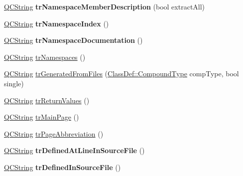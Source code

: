 \begin{DoxyCompactItemize}
\item 
\mbox{\label{class_translator_dutch_a76c136bcd3da1ec4d9bd0d3afda3864b}} 
\mbox{\hyperlink{class_q_c_string}{Q\+C\+String}} {\bfseries tr\+Namespace\+Member\+Description} (bool extract\+All)
\item 
\mbox{\label{class_translator_dutch_a561f514ca48fcc3adc2e9e7ef0eb7c33}} 
\mbox{\hyperlink{class_q_c_string}{Q\+C\+String}} {\bfseries tr\+Namespace\+Index} ()
\item 
\mbox{\label{class_translator_dutch_acff143c17da76c9e82f6f2e57650dcce}} 
\mbox{\hyperlink{class_q_c_string}{Q\+C\+String}} {\bfseries tr\+Namespace\+Documentation} ()
\item 
\mbox{\hyperlink{class_q_c_string}{Q\+C\+String}} \mbox{\hyperlink{class_translator_dutch_a7a1f8dcd415994a6f0b6441632a4b0ec}{tr\+Namespaces}} ()
\item 
\mbox{\hyperlink{class_q_c_string}{Q\+C\+String}} \mbox{\hyperlink{class_translator_dutch_a07117d7d48aa34302259b1645a1c8c42}{tr\+Generated\+From\+Files}} (\mbox{\hyperlink{class_class_def_ae70cf86d35fe954a94c566fbcfc87939}{Class\+Def\+::\+Compound\+Type}} comp\+Type, bool single)
\item 
\mbox{\hyperlink{class_q_c_string}{Q\+C\+String}} \mbox{\hyperlink{class_translator_dutch_ac5927c5b87285f71416fa7d8ddf89141}{tr\+Return\+Values}} ()
\item 
\mbox{\hyperlink{class_q_c_string}{Q\+C\+String}} \mbox{\hyperlink{class_translator_dutch_a29a18dfa81a6aa1484304796168331fc}{tr\+Main\+Page}} ()
\item 
\mbox{\hyperlink{class_q_c_string}{Q\+C\+String}} \mbox{\hyperlink{class_translator_dutch_abb872f2d56775594b66e583cfc78f2f2}{tr\+Page\+Abbreviation}} ()
\item 
\mbox{\label{class_translator_dutch_a6c3f7d3733b05a4dc9f0618eded7bdf3}} 
\mbox{\hyperlink{class_q_c_string}{Q\+C\+String}} {\bfseries tr\+Defined\+At\+Line\+In\+Source\+File} ()
\item 
\mbox{\label{class_translator_dutch_a17abe34daf3acd002e120341680166dd}} 
\mbox{\hyperlink{class_q_c_string}{Q\+C\+String}} {\bfseries tr\+Defined\+In\+Source\+File} ()
\item 

\end{DoxyCompactItemize}
